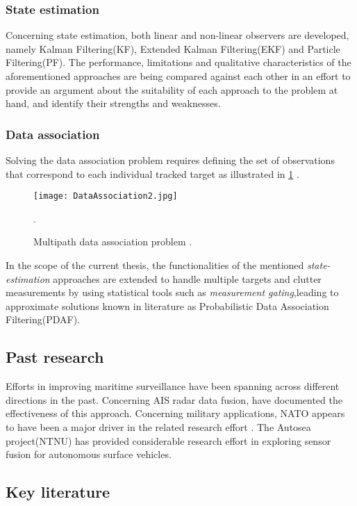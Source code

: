 \subsubsection{State estimation}
Concerning state estimation, both linear and non-linear observers are developed, namely Kalman Filtering(KF), Extended Kalman Filtering(EKF) and Particle Filtering(PF). The performance, limitations and qualitative characteristics of the aforementioned approaches are being compared against each other in an effort to provide an argument about the suitability of each approach to the problem at hand, and identify their strengths and weaknesses.
\subsubsection{Data association}
Solving the data association problem requires defining the set of observations that correspond to each individual tracked target as illustrated in \cref{fig:MultipathDA} .


\begin{figure}[H]
	\centering
	\texttt{[image: DataAssociation2.jpg]}
	\caption{ Multipath data association problem \cite{Lan2019}.}.
	\label{fig:MultipathDA}
\end{figure}

In the scope of the current thesis, the functionalities of the mentioned \emph{state-estimation} approaches are extended to handle multiple targets and clutter measurements by using statistical tools such as \emph{measurement gating},leading to approximate solutions known in literature as Probabilistic Data Association Filtering(PDAF). 

\subsection{Past research}
Efforts in improving maritime surveillance have been spanning across different directions in the past. Concerning  AIS radar data fusion,  \cite{Habtemariam2015}  \cite{Heymann2015} have documented the effectiveness of this approach. Concerning military applications, NATO appears to have been a major driver in the related research effort \cite{Guerriero2008,9781586035365}. The Autosea project(NTNU)  \cite{Brekke2019}has provided considerable research effort in exploring sensor fusion for autonomous surface vehicles.
\subsection{Key literature}
